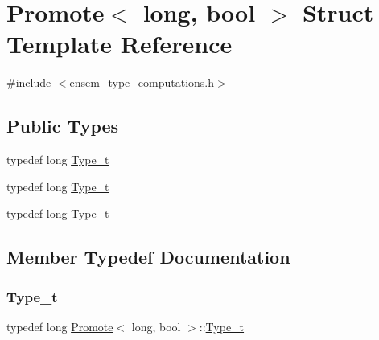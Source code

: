 \hypertarget{structPromote_3_01long_00_01bool_01_4}{}\section{Promote$<$ long, bool $>$ Struct Template Reference}
\label{structPromote_3_01long_00_01bool_01_4}


{\ttfamily \#include $<$ensem\+\_\+type\+\_\+computations.\+h$>$}

\subsection*{Public Types}
\begin{DoxyCompactItemize}
\item 
typedef long \mbox{\hyperlink{structPromote_3_01long_00_01bool_01_4_a925cd3195392464ce3df63fdd86c02bd}{Type\+\_\+t}}
\item 
typedef long \mbox{\hyperlink{structPromote_3_01long_00_01bool_01_4_a925cd3195392464ce3df63fdd86c02bd}{Type\+\_\+t}}
\item 
typedef long \mbox{\hyperlink{structPromote_3_01long_00_01bool_01_4_a925cd3195392464ce3df63fdd86c02bd}{Type\+\_\+t}}
\end{DoxyCompactItemize}


\subsection{Member Typedef Documentation}
\mbox{\label{structPromote_3_01long_00_01bool_01_4_a925cd3195392464ce3df63fdd86c02bd}} 
\subsubsection{\texorpdfstring{Type\_t}{Type\_t}\hspace{0.1cm}{\footnotesize\ttfamily [1/3]}}
{\footnotesize\ttfamily typedef long \mbox{\hyperlink{structPromote}{Promote}}$<$ long, bool $>$\+::\mbox{\hyperlink{structPromote_3_01long_00_01bool_01_4_a925cd3195392464ce3df63fdd86c02bd}{Type\+\_\+t}}}

\mbox{\label{structPromote_3_01long_00_01bool_01_4_a925cd3195392464ce3df63fdd86c02bd}} 
